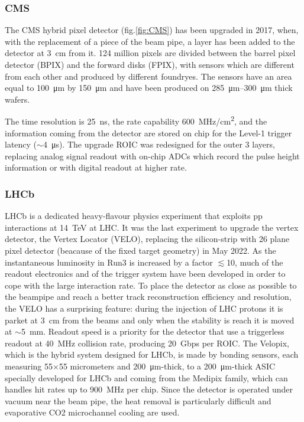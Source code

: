         \subsubsection{CMS}
        The CMS hybrid pixel detector (fig.\ref{fig:CMS}) has been upgraded in 2017, when, with the replacement of a piece of the beam pipe, a layer has been added to the detector at \SI{3}{cm} from it.
        124 million pixels are divided between the barrel pixel detector (BPIX) and the forward disks (FPIX), with sensors which are different from each other and produced by different foundryes. 
        The sensors have an area equal to \SI{100}{\um} by \SI{150}{\um} and have been produced on \SIrange{285}{300}{\um} thick wafers.
    
        The time resolution is \SI{25}{ns}, the rate capability  \SI{600}{MHz/cm\squared}, and the information coming from the detector are stored on chip for the Level-1 trigger latency ($\sim$\SI{4}{\us}). The upgrade ROIC was redesigned for the outer 3 layers, replacing analog signal readout with on-chip ADCs which record the pulse height information or with digital readout at higher rate. 

        \subsubsection{LHCb}
        LHCb is a dedicated heavy-flavour physics experiment that exploits pp interactions at \SI{14}{TeV} at LHC. 
        It was the last experiment to upgrade the vertex detector, the Vertex Locator (VELO), replacing the silicon-strip with 26 plane pixel detector (beacause of the fixed target geometry) in May 2022. 
        As the instantaneous luminosity in Run3 is increased by a factor $\lesssim$10, much of the readout electronics and of the trigger system have been developed in order to cope with the large interaction rate.
        To place the detector as close as possible to the beampipe and reach a better track reconstruction efficiency and resolution, the VELO has a surprising feature: during the injection of LHC protons it is parket at \SI{3}{cm} from the beams and only when the stability is reach it is moved at $\sim$\SI{5}{mm}. Readout speed is a priority for the detector that use a triggerless readout at \SI{40}{MHz} collision rate, producing \SI{20}{Gbps} per ROIC. 
        The Velopix, which is the hybrid system designed for LHCb, is made by bonding sensors, each measuring 55$\times$55 micrometers and \SI{200}{\um}-thick, to a \SI{200}{\um}-thick ASIC specially developed for LHCb and coming from the Medipix family, which can handles hit rates up to \SI{900}{MHz} per chip. 
        Since the detector is operated under vacuum near the beam pipe, the heat removal is particularly difficult and evaporative CO2 microchannel cooling are used. 

